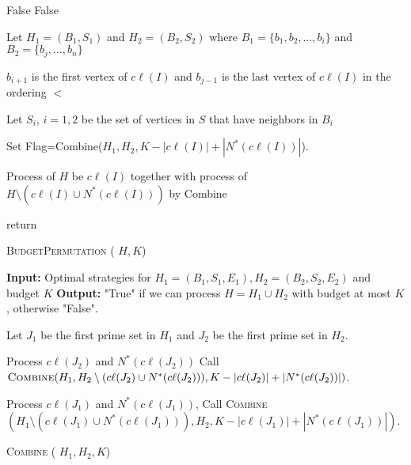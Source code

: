\documentclass[letterpaper,11pt,abstracton]{scrartcl}
\begin{document}
\begin{algorithm}[H]
\begin{algorithmic}[1]
\Return False\;
\EndIf
{}
\Return False\;
\EndIf

\State Let $H_1=(B_1,S_1)$ and $H_2=(B_2,S_2)$ where $B_1= \{b_1,b_2,\dots ,b_{i}\}$ and $B_2=\{b_{j},\dots,b_{n} \}$

 \hspace{2mm} $b_{i+1}$ is the first vertex of $c\ell(I)$ and $b_{j-1}$ is the last vertex of $c\ell(I)$ in the ordering $<$

\State Let $S_i$, $i=1,2$  be the set of vertices in $S$ that have neighbors in $B_i$
\;

\State Set Flag=Combine($H_1,H_2, K-|c\ell(I)|+|N^*(c\ell(I))|$).


 \State Process of $H$ be $c\ell(I)$ together with process of $H \setminus ( c\ell(I) \cup N^*(c\ell(I)))$ by Combine

 \State return

 \EndIf
\EndFor

 \EndFunction



\end{algorithmic}
\caption{{\textsc{BudgetPermutation}} ( $H, K$)}
\label{alg:permutation}
\end{algorithm}



\begin{algorithm}[H]
\begin{algorithmic}[1]
\State \textbf{Input:} Optimal strategies for $H_1=(B_1,S_1,E_1), H_2=(B_2,S_2,E_2)$ and budget $K$\;
\State \textbf{Output:} "True" if we can process $H=H_1\cup H_2$ with budget at most $K$, otherwise "False".\;

\State Let $J_1$ be the first prime set in $H_1$ and $J_2$ be the first prime set in $H_2$.

	\State Process $c\ell(J_2)$ and $N^*(c\ell(J_2))$
       \State Call $\textsc{Combine} (H_1, H_2 \setminus (c\ell(J_2) \cup N^*(c\ell(J_2))), K-|c\ell(J_2)|+|N^*	(c\ell(J_2))| ) $.


\Else{}  \State Process $ c\ell(J_1)$ and $N^*(c\ell(J_1))$,
         \State Call \textsc{Combine} $(H_1\setminus (c\ell(J_1) \cup N^*(c\ell(J_1))), H_2, K-|c\ell(J_1)|+|N^*(c\ell(J_1))| ) $.

\EndIf


\end{algorithmic}
\caption{{\textsc{Combine}} ( $H_1,H_2, K$)}
\label{combine}
\end{algorithm}
\end{document}
